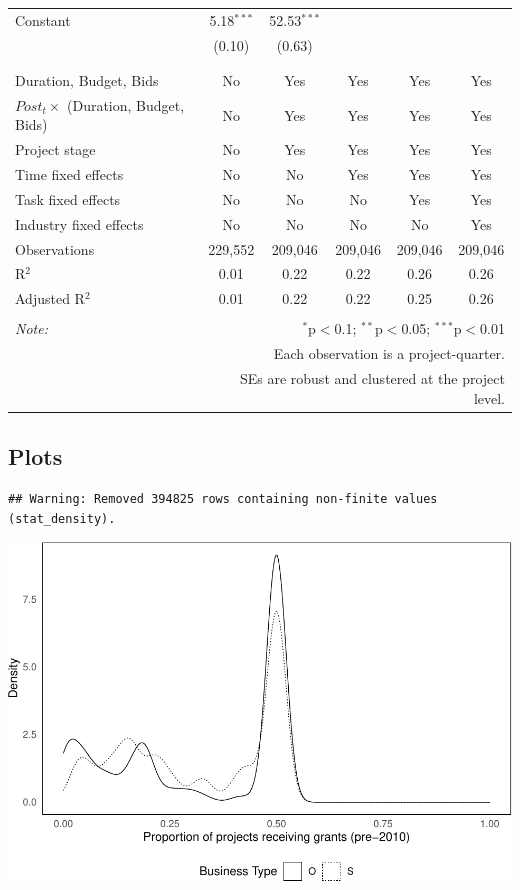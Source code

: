 \documentclass[
]{article}
\begin{document}
\begin{table}[H]
\begin{tabular}{@{\extracolsep{-2pt}}lccccc}
 Constant & 5.18$^{***}$ & 52.53$^{***}$ &  &  &  \\ 
  & (0.10) & (0.63) &  &  &  \\ 
  & & & & & \\ 
\hline \\[-1.8ex] 
Duration, Budget, Bids & No & Yes & Yes & Yes & Yes \\ 
$Post_t \times $  (Duration, Budget, Bids) & No & Yes & Yes & Yes & Yes \\ 
Project stage & No & Yes & Yes & Yes & Yes \\ 
Time fixed effects & No & No & Yes & Yes & Yes \\ 
Task fixed effects & No & No & No & Yes & Yes \\ 
Industry fixed effects & No & No & No & No & Yes \\ 
Observations & 229,552 & 209,046 & 209,046 & 209,046 & 209,046 \\ 
R$^{2}$ & 0.01 & 0.22 & 0.22 & 0.26 & 0.26 \\ 
Adjusted R$^{2}$ & 0.01 & 0.22 & 0.22 & 0.25 & 0.26 \\ 
\hline 
\hline \\[-1.8ex] 
\textit{Note:}  & \multicolumn{5}{r}{$^{*}$p$<$0.1; $^{**}$p$<$0.05; $^{***}$p$<$0.01} \\ 
 & \multicolumn{5}{r}{Each observation is a project-quarter.} \\ 
 & \multicolumn{5}{r}{SEs are robust and clustered at the project level.} \\ 
\end{tabular} 
\end{table}

\hypertarget{plots-1}{%
\subsection{Plots}\label{plots-1}}

\begin{verbatim}
## Warning: Removed 394825 rows containing non-finite values (stat_density).
\end{verbatim}

\includegraphics{qp_first_pc_delay-2_files/figure-latex/grants_plots-1.pdf}
\end{document}
